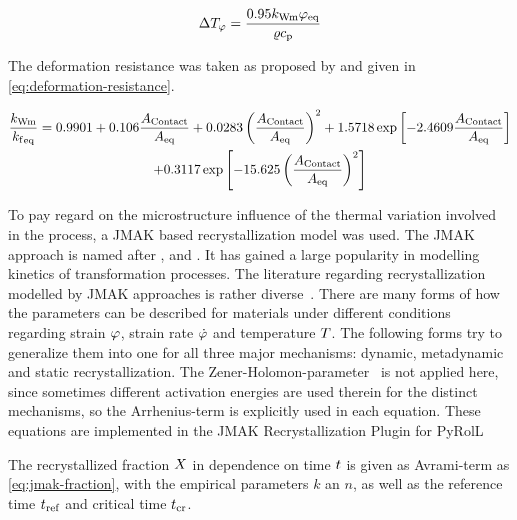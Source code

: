 \begin{equation}
    \Delta T_\varphi = \frac{\num{0.95} k_\mathrm{Wm} {\varphi}_\mathrm{eq}}{\varrho c_\mathrm{p}}
    \label{eq:heat-deformation}
\end{equation}

The deformation resistance was taken as proposed by \textcite{Hensel1978} and given in \autoref{eq:deformation-resistance}.

\begin{multline}
    \frac{k_\mathrm{Wm}}{{k_\mathrm{f}}_\mathrm{eq}} = \num{0.9901} + \num{0.106} \frac{A_\mathrm{Contact}}{{A}_\mathrm{eq}} + \num{0.0283} \left( \frac{A_\mathrm{Contact}}{{A}_\mathrm{eq}} \right)^2 + \num{1.5718} \exp \left[ \num{-2.4609} \frac{A_\mathrm{Contact}}{{A}_\mathrm{eq}} \right] \\
    + \num{0.3117} \exp \left[ \num{-15.625} \left( \frac{A_\mathrm{Contact}}{{A}_\mathrm{eq}} \right)^2 \right]
    \label{eq:deformation-resistance}
\end{multline}

To pay regard on the microstructure influence of the thermal variation involved in the process, a JMAK based recrystallization model was used.
The JMAK approach is named after \textcite{Johnson1939}, \textcite{Avrami1939, Avrami1940, Avrami1941} and \textcite{Kolmogorov1937}.
It has gained a large popularity in modelling kinetics of transformation processes.
The literature regarding recrystallization modelled by JMAK approaches is rather diverse~\cite{Luton1969, Sellars1978, Sellars1979, Sellars1985, Beynon1992, Glover1972, Glover1973, Hodgson1992, Laasraoui1991, Laasraoui1991a, Hernandez1996, Medina1996, Fernandez2000, Fernandez2003, Karhausen1992,Roberts1979, Maccagno1996, Siciliano2000}.
There are many forms of how the parameters can be described for materials under different conditions regarding strain $\varphi$, strain rate $\dot{\varphi}$ and temperature $T$.
The following forms try to generalize them into one for all three major mechanisms: dynamic, metadynamic and static recrystallization.
The Zener-Holomon-parameter~\cite{Zener1944} is not applied here, since sometimes different activation energies are used therein for the distinct mechanisms, so the Arrhenius-term is explicitly used in each equation.
These equations are implemented in the JMAK Recrystallization Plugin for PyRolL~\cite{pyroll-jmak-recrystallization}

The recrystallized fraction $X$ in dependence on time $t$ is given as Avrami-term as \autoref{eq:jmak-fraction}, with the empirical parameters $k$ an $n$, as well as the reference time $t_{\mathrm{ref}}$ and critical time $t_{\mathrm{cr}}$.


